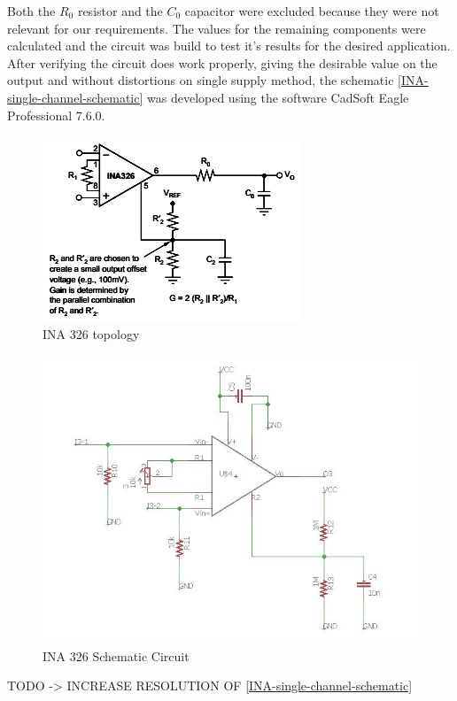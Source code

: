 Both the $R_0$ resistor and the $C_0$ capacitor were excluded because they were not
relevant for our requirements. The values for the remaining components were calculated
and the circuit was build to test it's results for the desired application.
After verifying the circuit does work properly, giving the desirable value on the output and without
distortions on single supply method, the schematic \autoref{INA-single-channel-schematic} was
developed using the software CadSoft Eagle Professional 7.6.0.
\begin{figure}[!htpb]
  \centering
  \caption{INA 326 topology}
  \label{INA_topology}
  \includegraphics[scale=0.7]{images/INA/datasheet}
\end{figure}

\begin{figure}[!htpb]
  \centering
  \caption{INA 326 Schematic Circuit}
  \label{INA-single-channel-schematic}
  \includegraphics[scale=0.65]{images/INA/single-channel-schematic}
\end{figure}
TODO -> INCREASE RESOLUTION OF \autoref{INA-single-channel-schematic}\\

